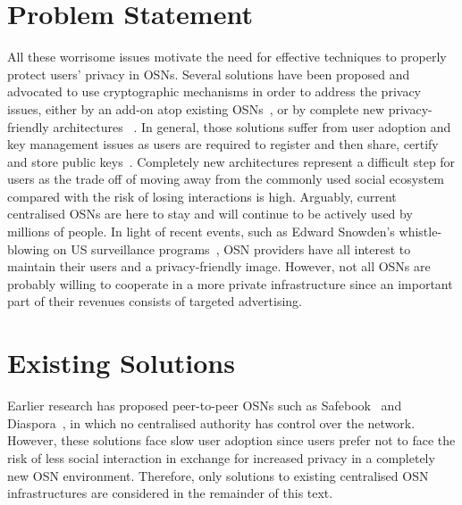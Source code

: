 \section{Problem Statement}
\label{sec:problem_statement}
All these worrisome issues motivate the need for effective techniques to properly protect users' privacy in OSNs. Several solutions have been proposed and advocated to use cryptographic mechanisms in order to address the privacy issues, either by an add-on atop existing OSNs~\cite{art:BadenBSBS09,art:BeatoKW11,art:GuhaSTF08,art:LuoXH09}, or by complete new privacy-friendly architectures~ \cite{art:CristofaroSTW11,art:CutilloMO11,NYT2010.Diaspora}. In general, those solutions suffer from user adoption and key management issues as users are required to register and then share, certify and store public keys~\cite{art:BalseBADG14}. Completely new architectures represent a difficult step for users as the trade off of moving away from the commonly used social ecosystem compared with the risk of losing interactions is high. Arguably, current centralised OSNs are here to stay and will continue to be actively used by millions of people. In light of recent events, such as Edward Snowden's whistle-blowing on US surveillance programs~\cite{prism}, OSN providers have all interest to maintain their users and a privacy-friendly image. However, not all OSNs are probably willing to cooperate in a more private infrastructure since an important part of their revenues consists of targeted advertising.


\section{Existing Solutions}
\label{sec:existing_solutions}
Earlier research has proposed peer-to-peer OSNs such as Safebook~\cite{art:CutilloMO11} and Diaspora~\cite{NYT2010.Diaspora}, in which no centralised authority has control over the network. However, these solutions face slow user adoption since users prefer not to face the risk of less social interaction in exchange for increased privacy in a completely new OSN environment. Therefore, only solutions to existing centralised OSN infrastructures are considered in the remainder of this text.

